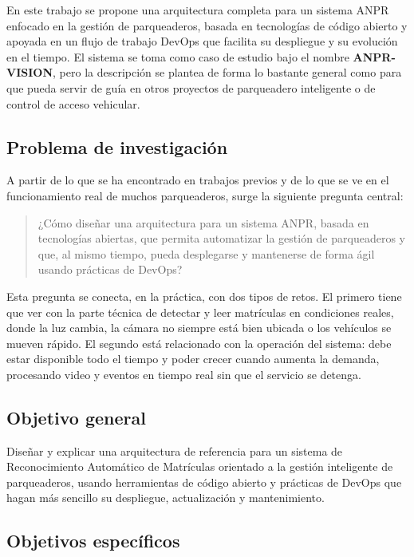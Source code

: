 En este trabajo se propone una arquitectura completa para un sistema ANPR enfocado en la gestión de parqueaderos, basada en tecnologías de código abierto y apoyada en un flujo de trabajo DevOps que facilita su despliegue y su evolución en el tiempo. El sistema se toma como caso de estudio bajo el nombre \textbf{ANPR-VISION}, pero la descripción se plantea de forma lo bastante general como para que pueda servir de guía en otros proyectos de parqueadero inteligente o de control de acceso vehicular.

\subsection{Problema de investigación}

A partir de lo que se ha encontrado en trabajos previos y de lo que se ve en el funcionamiento real de muchos parqueaderos, surge la siguiente pregunta central:

\begin{quote}
¿Cómo diseñar una arquitectura para un sistema ANPR, basada en tecnologías abiertas, que permita automatizar la gestión de parqueaderos y que, al mismo tiempo, pueda desplegarse y mantenerse de forma ágil usando prácticas de DevOps?
\end{quote}

Esta pregunta se conecta, en la práctica, con dos tipos de retos. El primero tiene que ver con la parte técnica de detectar y leer matrículas en condiciones reales, donde la luz cambia, la cámara no siempre está bien ubicada o los vehículos se mueven rápido. El segundo está relacionado con la operación del sistema: debe estar disponible todo el tiempo y poder crecer cuando aumenta la demanda, procesando video y eventos en tiempo real sin que el servicio se detenga.

\subsection{Objetivo general}

Diseñar y explicar una arquitectura de referencia para un sistema de Reconocimiento Automático de Matrículas orientado a la gestión inteligente de parqueaderos, usando herramientas de código abierto y prácticas de DevOps que hagan más sencillo su despliegue, actualización y mantenimiento.

\subsection{Objetivos específicos}


